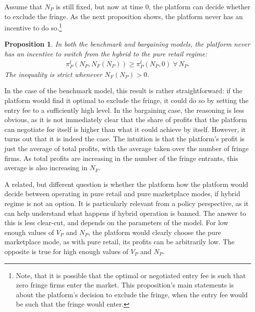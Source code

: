 \documentclass[a4paper]{article}
\newtheorem{proposition}{Proposition}
\begin{document}
Assume that $N_P$ is still fixed, but now at time 0, the platform can decide whether to exclude the fringe.
As the next proposition shows, the platform never has an incentive to do so.\footnote{
    Note, that it is possible that the optimal or negotiated entry fee is such that zero fringe firms enter the market.
    This proposition's main statements is about the platform's decision to exclude the fringe, when the entry fee would be such that the fringe would enter.
}
\begin{proposition}
    \label{prop:hybrid_vs_retail}
    In both the benchmark and bargaining models, the platform never has an incentive to switch from the hybrid to the pure retail regime:
    \begin{align*}
        \pi_P^t(N_P, N_F(N_P)) \geq \pi_P^t(N_P, 0) \;\forall\, N_P.
    \end{align*}
    The inequality is strict whenever $N_F(N_P) > 0$.
\end{proposition}
In the case of the benchmark model, this result is rather straightforward: if the platform would find it optimal to exclude the fringe, it could do so by setting the entry fee to a sufficiently high level.
In the bargaining case, the reasoning is less obvious, as it is not immediately clear that the share of profits that the platform can negotiate for itself is higher than what it could achieve by itself.
However, it turns out that it is indeed the case.
The intuition is that the platform's profit is just the average of total profits, with the average taken over the number of fringe firms.
As total profits are increasing in the number of the fringe entrants, this average is also increasing in $N_F$.

A related, but different question is whether the platform how the platform would decide between operating in pure retail and pure marketplace modes, if hybrid regime is not an option.
It is particularly relevant from a policy perspective, as it can help understand what happens if hybrid operation is banned.
The answer to this is less clear-cut, and depends on the parameters of the model.
For low enough values of $V_P$ and $N_P$, the platform would clearly choose the pure marketplace mode, as with pure retail, its profits can be arbitrarily low.
The opposite is true for high enough values of $V_P$ and $N_P$.
\end{document}
